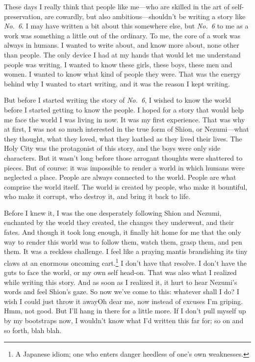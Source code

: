 These days I really think that people like me---who are skilled in the art
of self-preservation, are cowardly, but also ambitious---shouldn't be
writing a story like \emph{No.~6}. I may have written a bit about this
somewhere else, but \emph{No.~6} to me as a work was something a little out of
the ordinary. To me, the core of a work was always in humans. I wanted
to write about, and know more about, none other than people. The only
device I had at my hands that would let me understand people was
writing. I wanted to know these girls, these boys, these men and women.
I wanted to know what kind of people they were. That was the energy
behind why I wanted to start writing, and it was the reason I kept
writing.

But before I started writing the story of \emph{No.~6}, I wished to know the
world before I started getting to know the people. I hoped for a story
that would help me face the world I was living in now. It was my first
experience. That was why at first, I was not so much interested in the
true form of Shion, or Nezumi---what they thought, what they loved, what
they loathed as they lived their lives. The Holy City was the
protagonist of this story, and the boys were only side characters. But
it wasn't long before those arrogant thoughts were shattered to pieces.
But of course: it was impossible to render a world in which humans were
neglected a place. People are always connected to the world. People are
what comprise the world itself. The world is created by people, who make
it bountiful, who make it corrupt, who destroy it, and bring it back to
life.

Before I knew it, I was the one desperately following Shion and Nezumi,
enchanted by the world they created, the changes they underwent, and
their fates. And though it took long enough, it finally hit home for me
that the only way to render this world was to follow them, watch them,
grasp them, and pen them. It was a reckless challenge. I feel like a
praying mantis brandishing its tiny claws at an enormous oncoming cart.\footnote{A Japanese idiom; one who enters danger heedless of one's own weaknesses.}
I don't have that resolve. I don't have the guts to face the world, or
my own self head-on. That was also what I realized while writing this
story. And as soon as I realized it, it hurt to hear Nezumi's words and
feel Shion's gaze. So now we've come to this: whatever shall I do? I
wish I could just throw it away\el Oh dear me, now instead of excuses
I'm griping. Hmm, not good. But I'll hang in there for a little more. If
I don't pull myself up by my bootstraps now, I wouldn't know what I'd
written this far for; so on and so forth, blah blah.

